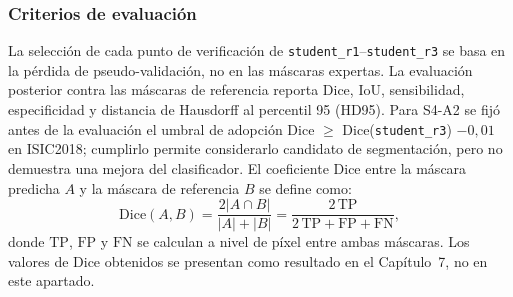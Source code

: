 \subsubsection{Criterios de evaluación}

La selección de cada punto de verificación de \texttt{student\_r1}--\texttt{student\_r3} se basa en la pérdida de pseudo-validación, no en las máscaras expertas. La evaluación posterior contra las máscaras de referencia reporta Dice, IoU, sensibilidad, especificidad y distancia de Hausdorff al percentil 95 (HD95). Para S4-A2 se fijó antes de la evaluación el umbral de adopción Dice $\geq$ Dice(\texttt{student\_r3}) $-0{,}01$ en ISIC2018; cumplirlo permite considerarlo candidato de segmentación, pero no demuestra una mejora del clasificador. El coeficiente Dice entre la máscara predicha $A$ y la máscara de referencia $B$ se define como:
\begin{equation}
 \mathrm{Dice}(A,B)=\frac{2|A\cap B|}{|A|+|B|}=\frac{2\,\mathrm{TP}}{2\,\mathrm{TP}+\mathrm{FP}+\mathrm{FN}},
 \label{eq:dice-s6}
\end{equation}
donde $\mathrm{TP}$, $\mathrm{FP}$ y $\mathrm{FN}$ se calculan a nivel de píxel entre ambas máscaras. Los valores de Dice obtenidos se presentan como resultado en el Capítulo~7, no en este apartado.

